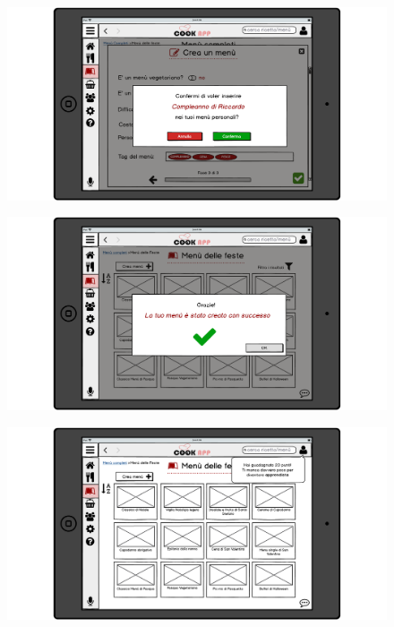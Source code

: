 \begin{figure}[H]
	\centering
	\includegraphics[width=0.95\linewidth]{img/mockup/menu-crea-5.png}
\end{figure}
\begin{figure}[H]
	\centering
	\includegraphics[width=0.95\linewidth]{img/mockup/menu-crea-6.png}
\end{figure}
\begin{figure}[H]
	\centering
	\includegraphics[width=0.95\linewidth]{img/mockup/menu-crea-7.png}
\end{figure}

